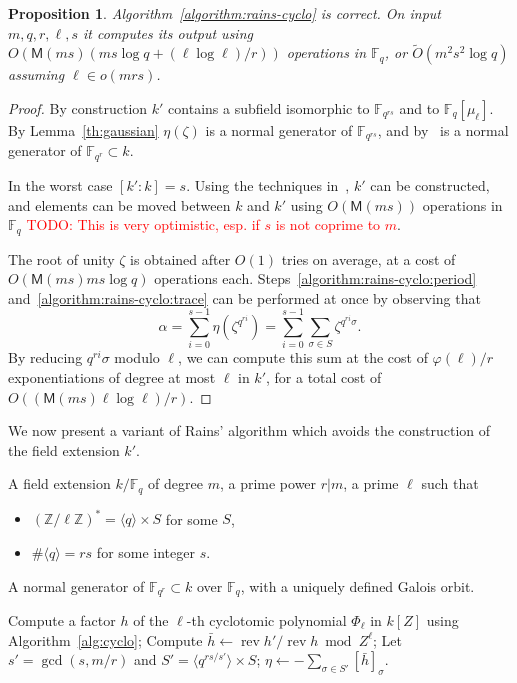 \documentclass[12pt]{article}
\theoremstyle{plain}
\newtheorem{proposition}[theorem]{Proposition}
\theoremstyle{definition}
\newcommand{\tildO}{\tilde{O}}
\newcommand{\todo}[1]{\textcolor{red}{TODO: #1}}
\DeclareMathOperator{\rev}{rev}
\def\Z{\ensuremath{\mathbb{Z}}}
\def\F{\ensuremath{\mathbb{F}}}
\def\MM{\ensuremath{\mathsf{M}}}
\def\euler{\ensuremath{\varphi}}
\newcounter{algorithm}
\begin{document}
\begin{proposition}
  Algorithm~\ref{algorithm:rains-cyclo} is correct. On input
  $m,q,r,\ell,s$ it computes its output using $O(\MM(ms)(ms\log q +
  (\ell\log\ell)/r))$ operations in $\F_q$, or $\tildO(m^2s^2\log q)$
  assuming $\ell\in o(mrs)$.
\end{proposition}
\begin{proof}
  By construction $k'$ contains a subfield isomorphic to $\F_{q^{rs}}$
  and to $\F_q[\mu_\ell]$. By Lemma~\ref{th:gaussian} $\eta(\zeta)$ is
  a normal generator of $\F_{q^{rs}}$, and
  by~\cite[Prop.~5.2.3.1]{mullen2013handbook} is a normal generator of
  $\F_{q^r}\subset k$.

  In the worst case $[k':k]=s$. Using the techniques
  in~\cite{couveignes+lercier11,DeDoSc13,DeFeo:2014:FAA:2608628.2608672},
  $k'$ can be constructed, and elements can be moved between $k$ and
  $k'$ using $O(\MM(ms))$ operations in $\F_q$ \todo{This is very
    optimistic, esp. if $s$ is not coprime to $m$}.

  The root of unity $\zeta$ is obtained after $O(1)$ tries on average,
  at a cost of $O(\MM(ms)ms\log q)$ operations each.
  Steps~\ref{algorithm:rains-cyclo:period}
  and~\ref{algorithm:rains-cyclo:trace} can be performed at once by
  observing that
  \[\alpha = \sum_{i=0}^{s-1}\eta(\zeta^{q^{ri}})= \sum_{i=0}^{s-1}\sum_{\sigma\in S}\zeta^{q^{ri}\sigma}.\]
  By reducing $q^{ri}\sigma$ modulo $\ell$, we can compute this sum at
  the cost of $\euler(\ell)/r$ exponentiations of degree at most
  $\ell$ in $k'$, for a total cost of $O((\MM(ms)\ell\log\ell)/r)$.
\end{proof}

We now present a variant of Rains' algorithm which avoids the
construction of the field extension $k'$. 

\begin{algorithm}
  \label{algorithm:rains-cyclo-2}
  \begin{algorithmic}[1]
    \REQUIRE A field extension $k/\F_q$ of degree $m$, a prime power
    $r|m$, a prime $\ell$ such that
    \begin{itemize}
    \item $(\Z/\ell\Z)^\ast = \langle q\rangle \times S$ for some $S$,
    \item $\#\langle q\rangle = rs$ for some integer $s$.
    \end{itemize}
    \ENSURE A normal generator of $\F_{q^r}\subset k$ over $\F_q$,
    with a uniquely defined Galois orbit.
    
    \STATE Compute a factor $h$ of the $\ell$-th cyclotomic polynomial $\Phi_\ell$ in $k[Z]$ using Algorithm~\ref{alg:cyclo}; 
    \STATE Compute $\bar{h} \leftarrow \rev{h'}/\rev{h} \bmod Z^\ell$;
    \STATE Let $s'=\gcd(s,m/r)$ and $S' = \langle q^{rs/s'}\rangle \times S$;
    \RETURN\label{algorithm:rains-cyclo:period} $\eta \leftarrow -\sum_{\sigma\in S'}[\bar{h}]_\sigma$.
  \end{algorithmic}
\end{algorithm}
\end{document}
